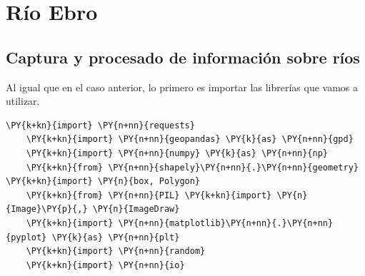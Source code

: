 \section{Río Ebro}

\subsection{Captura y procesado de información sobre ríos}
Al igual que en el caso anterior, lo primero es importar las librerías que vamos a utilizar.
\begin{tcolorbox}[breakable, size=fbox, boxrule=1pt, pad at break*=1mm,colback=cellbackground, colframe=cellborder, fontupper=\footnotesize]
    \begin{Verbatim}[commandchars=\\\{\}]
    \PY{k+kn}{import} \PY{n+nn}{requests}
    \PY{k+kn}{import} \PY{n+nn}{geopandas} \PY{k}{as} \PY{n+nn}{gpd}
    \PY{k+kn}{import} \PY{n+nn}{numpy} \PY{k}{as} \PY{n+nn}{np}
    \PY{k+kn}{from} \PY{n+nn}{shapely}\PY{n+nn}{.}\PY{n+nn}{geometry} \PY{k+kn}{import} \PY{n}{box, Polygon}
    \PY{k+kn}{from} \PY{n+nn}{PIL} \PY{k+kn}{import} \PY{n}{Image}\PY{p}{,} \PY{n}{ImageDraw}
    \PY{k+kn}{import} \PY{n+nn}{matplotlib}\PY{n+nn}{.}\PY{n+nn}{pyplot} \PY{k}{as} \PY{n+nn}{plt}
    \PY{k+kn}{import} \PY{n+nn}{random}
    \PY{k+kn}{import} \PY{n+nn}{io}
    \end{Verbatim}
\end{tcolorbox}

